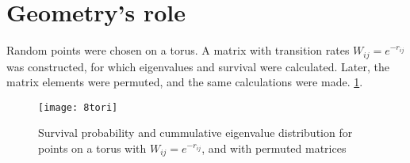 \documentclass[onecolumn,fleqn]{revtex4}
\begin{document}
\section{Geometry's role}
Random points were chosen on a torus. A matrix with transition rates $W_{ij} = e^{-r_{ij}}$ was constructed, for which eigenvalues and survival were calculated. Later, the matrix elements were permuted, and the same calculations were made. \ref{fig:distance}.
\begin{figure}
    \texttt{[image: 8tori]}
    \caption{Survival probability and cummulative eigenvalue distribution for points on a torus with $W_{ij} = e^{-r_{ij}}$, and with permuted matrices}
    \label{fig:distance}
\end{figure}



\end{document}
